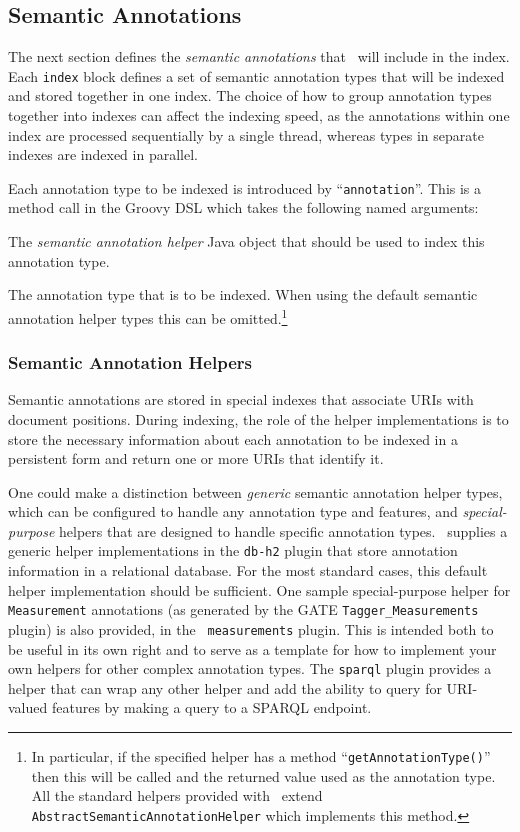 \subsection*{Semantic Annotations}\label{sec:indexing:helpers}

The next section defines the {\em semantic annotations} that \Mimir\ will
include in the index.  Each \lstinline!index! block defines a set of semantic
annotation types that will be indexed and stored together in one index.  The
choice of how to group annotation types together into indexes can affect the
indexing speed, as the annotations within one index are processed sequentially
by a single thread, whereas types in separate indexes are indexed in parallel.

Each annotation type to be indexed is introduced by ``{\tt annotation}''.  This
is a method call in the Groovy DSL which takes the following named arguments:
\bde
\item[helper] The {\em semantic annotation helper} Java object that should be
  used to index this annotation type.
\item[type] The annotation type that is to be indexed.  When using the default
  semantic annotation helper types this can be omitted.\footnote{In particular,
  if the specified helper has a method ``{\tt getAnnotationType()}'' then this
  will be called and the returned value used as the annotation type.  All the
  standard helpers provided with \Mimir\ extend
  {\tt AbstractSemanticAnnotationHelper} which implements this method.}
\ede

\subsubsection{Semantic Annotation Helpers}

Semantic annotations are stored in special indexes that associate URIs with
document positions. During indexing, the role of the helper implementations is 
to store the necessary information about each annotation to be indexed in a
persistent form and return one or more URIs that identify it.

One could make a distinction between {\em generic} semantic annotation helper
types, which can be configured to handle any annotation type and features, and
{\em special-purpose} helpers that are designed to handle specific annotation
types.  \Mimir\ supplies a generic helper implementations in the {\tt db-h2}
plugin that store annotation information in a relational database.  For the most
standard cases, this default helper implementation should be sufficient.  One
sample special-purpose helper for {\tt Measurement} annotations (as generated by
the GATE {\tt Tagger\_Measurements} plugin) is also provided, in the {\tt
measurements} plugin.  This is intended both to be useful in its own right and
to serve as a template for how to implement your own helpers for other complex
annotation types.  The {\tt sparql} plugin provides a helper that can wrap any
other helper and add the ability to query for URI-valued features by making a
query to a SPARQL endpoint.

